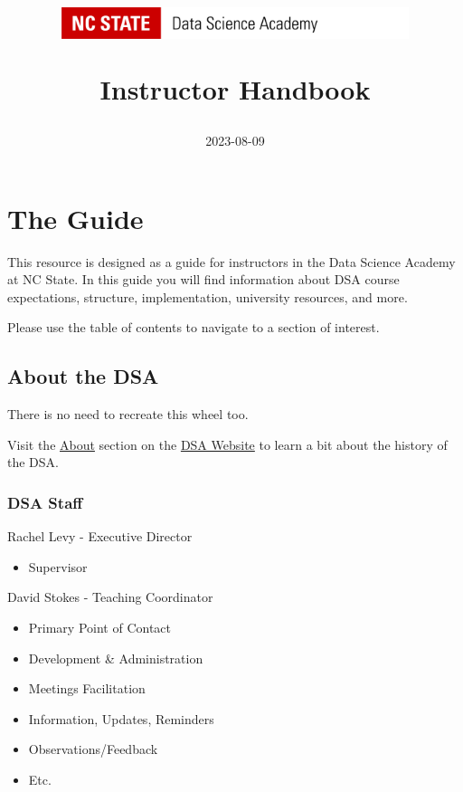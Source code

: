 \documentclass[
]{book}
\title{\includegraphics[width=4in,height=\textheight]{DSA Logo.png}

Instructor Handbook}
\author{2023-08-09}
\date{}
\providecommand{\tightlist}{%
  \setlength{\itemsep}{0pt}\setlength{\parskip}{0pt}}
\begin{document}
\maketitle

{
\setcounter{tocdepth}{1}
\tableofcontents
}
\hypertarget{the-guide}{%
\chapter{The Guide}\label{the-guide}}

This resource is designed as a guide for instructors in the Data Science Academy at NC State. In this guide you will find information about DSA course expectations, structure, implementation, university resources, and more.

Please use the table of contents to navigate to a section of interest.

\hypertarget{about-the-dsa}{%
\section{About the DSA}\label{about-the-dsa}}

There is no need to recreate this wheel too.

Visit the \href{https://datascienceacademy.ncsu.edu/about/}{About} section on the \href{https://datascienceacademy.ncsu.edu/}{DSA Website} to learn a bit about the history of the DSA.

\hypertarget{dsa-staff}{%
\subsection{DSA Staff}\label{dsa-staff}}

Rachel Levy - Executive Director

\begin{itemize}
\tightlist
\item
  Supervisor
\end{itemize}

David Stokes - Teaching Coordinator

\begin{itemize}
\tightlist
\item
  Primary Point of Contact
\item
  Development \& Administration
\item
  Meetings Facilitation
\item
  Information, Updates, Reminders
\item
  Observations/Feedback
\item
  Etc.
\end{itemize}
\end{document}

